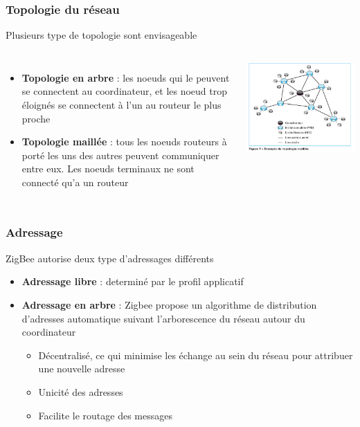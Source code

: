 \documentclass{beamer}
\begin{document}
  
  \begin{frame}
   \frametitle{Topologie du réseau}
   \begin{block}{Plusieurs type de topologie sont envisageable}
   \begin{columns}
    \begin{itemize}
     \item \textbf{Topologie en arbre} : les noeuds qui le peuvent se connectent au coordinateur, et les noeud trop éloignés se connectent à l'un au routeur le plus proche
     \item \textbf{Topologie maillée} : tous les noeuds routeurs à porté les uns des autres peuvent communiquer entre eux. Les noeuds terminaux ne sont connecté qu'a un routeur
    \end{itemize}
    \includegraphics[scale=0.25]{Topologie-Maille.png}
   \end{columns}
   \end{block}
  \end{frame}
  
  \begin{frame}
    \frametitle{Adressage}
    \begin{block}{ZigBee autorise deux type d'adressages différents}
      \begin{itemize}
	\item \textbf{Adressage libre} : determiné par le profil applicatif
	 \item \textbf{Adressage en arbre} : Zigbee propose un algorithme de distribution d'adresses automatique suivant l'arborescence du réseau autour du coordinateur
	 \begin{itemize}
	  \item Décentralisé, ce qui minimise les échange au sein du réseau pour attribuer une nouvelle adresse
	  \item Unicité des adresses
	  \item Facilite le routage des messages
	 \end{itemize}

      \end{itemize}     
    \end{block}
  \end{frame}
  
\end{document}
